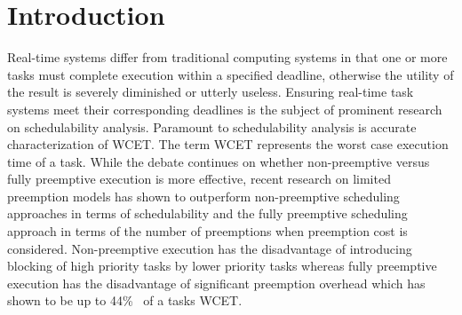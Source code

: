 \vspace{-10pt}
\section{Introduction}\label{sec:introduction}

Real-time systems differ from traditional computing systems in that one or more tasks must complete execution within a specified deadline, otherwise the utility of the result is severely diminished or utterly useless.  Ensuring real-time task systems meet their corresponding deadlines is the subject of prominent research on schedulability analysis.  Paramount to schedulability analysis is accurate characterization of WCET.  The term WCET represents the worst case execution time of a task.  While the debate continues on whether non-preemptive versus fully preemptive execution is more effective, recent research on limited preemption models has shown to outperform non-preemptive scheduling approaches in terms of schedulability and the fully preemptive scheduling approach in terms of the number of preemptions when preemption cost is considered.  Non-preemptive execution has the disadvantage of introducing blocking of high priority tasks by lower priority tasks whereas fully preemptive execution has the disadvantage of significant preemption overhead which has shown to be up to 44\%~\cite{pellizzoni:07,pellizzoni:08,pellizzoni:11} of a tasks WCET.

